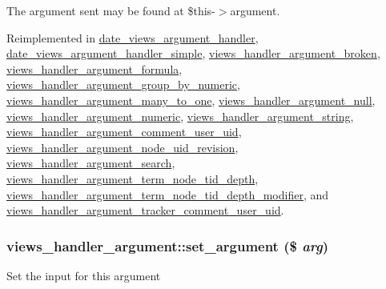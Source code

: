 The argument sent may be found at \$this-\/$>$argument. 

Reimplemented in \hyperlink{classdate__views__argument__handler_aa7df86c9e200ef7e797e1ba4f2fa1158}{date\_\-views\_\-argument\_\-handler}, \hyperlink{classdate__views__argument__handler__simple_a284da1e34334bd9086194eef7a803d27}{date\_\-views\_\-argument\_\-handler\_\-simple}, \hyperlink{classviews__handler__argument__broken_a2697e474f3439165001a9a56f82e0e6d}{views\_\-handler\_\-argument\_\-broken}, \hyperlink{classviews__handler__argument__formula_aa8108173e62c8c7dfb17e734dce537b5}{views\_\-handler\_\-argument\_\-formula}, \hyperlink{classviews__handler__argument__group__by__numeric_ae17513cfe9036aba188964ef9982852b}{views\_\-handler\_\-argument\_\-group\_\-by\_\-numeric}, \hyperlink{classviews__handler__argument__many__to__one_acea956eb95d4490acf996a8282d4aedd}{views\_\-handler\_\-argument\_\-many\_\-to\_\-one}, \hyperlink{classviews__handler__argument__null_ab2358d01dc1374da42a1ae45dff90dae}{views\_\-handler\_\-argument\_\-null}, \hyperlink{classviews__handler__argument__numeric_aae525ea5d6722ebf04d1fa21f79a1a5b}{views\_\-handler\_\-argument\_\-numeric}, \hyperlink{classviews__handler__argument__string_a71b6d00e2153228362f443353617a7be}{views\_\-handler\_\-argument\_\-string}, \hyperlink{classviews__handler__argument__comment__user__uid_a6c3118256c6d2c60167d289c947d31c6}{views\_\-handler\_\-argument\_\-comment\_\-user\_\-uid}, \hyperlink{classviews__handler__argument__node__uid__revision_a25585cd59a236e99a364fe0a1d6f9b90}{views\_\-handler\_\-argument\_\-node\_\-uid\_\-revision}, \hyperlink{classviews__handler__argument__search_a6760db3786242bb40df768e66d63436f}{views\_\-handler\_\-argument\_\-search}, \hyperlink{classviews__handler__argument__term__node__tid__depth_a0e537f160d9c8da21a844133ded89672}{views\_\-handler\_\-argument\_\-term\_\-node\_\-tid\_\-depth}, \hyperlink{classviews__handler__argument__term__node__tid__depth__modifier_af38aca7016ef74b4fe04dc33fb332748}{views\_\-handler\_\-argument\_\-term\_\-node\_\-tid\_\-depth\_\-modifier}, and \hyperlink{classviews__handler__argument__tracker__comment__user__uid_aa47cdf41b905e786067d25527bca1f1f}{views\_\-handler\_\-argument\_\-tracker\_\-comment\_\-user\_\-uid}.\hypertarget{classviews__handler__argument_ab5a0444df1eb5d71720e94a0faa0a34c}{
\subsubsection[{set\_\-argument}]{\setlength{\rightskip}{0pt plus 5cm}views\_\-handler\_\-argument::set\_\-argument (\$ {\em arg})}}
\label{classviews__handler__argument_ab5a0444df1eb5d71720e94a0faa0a34c}
Set the input for this argument

